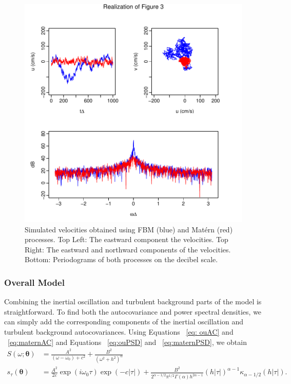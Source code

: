 \documentclass{stat572Style}
\begin{document}
\begin{figure}[h!]
  \centering
    \includegraphics[width=.7\textwidth]{ReplicatedFigures/fig3.pdf}
        \caption{Simulated velocities obtained using FBM (blue) and Mat\'{e}rn (red)  processes. Top Left: The eastward component the velocities. Top Right: The eastward and northward components of the velocities. Bottom: Periodograms of both processes on the decibel scale. }
        	\label{fig: fmbMat}
\end{figure}

\subsubsection{Overall Model}
Combining the inertial oscillation and turbulent background parts of the model is straightforward.
 To find both the autocovariance and power spectral densities, we can simply add the corresponding components of the inertial oscillation and turbulent background autocovariances. 
 Using Equations ~\ref{eq: ouAC} and ~\ref{eq:maternAC} and Equations ~\ref{eq:ouPSD} and ~\ref{eq:maternPSD}, we obtain
\begin{align}
S(\omega; \boldsymbol{\theta}) &= \frac{A^{2}}{(\omega - \omega_{0}) + c^{2}} + \frac{B^{2}}{(\omega^{2} + h^{2})^{\alpha}}\\
\label{eq: fullSpec}
s_{\tau}(\boldsymbol{\theta}) &= \frac{A^{2}}{2c} \exp(i \omega_{0}\tau) \exp(-c|\tau|) +  \frac{B^{2}}{2^{\alpha - 1/2}\pi^{1/2} \Gamma(\alpha) h^{2 \alpha - 1}}(h|\tau|)^{\alpha - 1}\kappa_{\alpha - 1/2}(h|\tau|).
\end{align}
\end{document}
